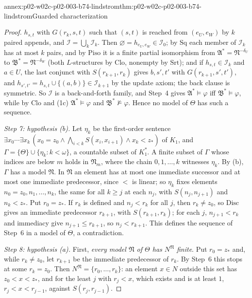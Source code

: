 \begin{annexitem}{annex:p02-w02c-p02-003-b74-lindstrom}{thm:p02-w02c-p02-003-b74-lindstrom}{Guarded characterization}
\begin{proof}
\(h_{s,t}\) with \(G(r_k,s,t)\) such that \((s,t)\) is reached from
\((e_U,e_W)\) by \(k\) paired appends, and \(\mathcal I=\bigcup_k\mathcal
I_k\).  Then \(\varnothing=h_{e_U,e_W}\in\mathcal I_0\); by \(\mathrm{Sq}\)
each member of \(\mathcal I_k\) has at most \(k\) pairs, and by
\(\mathrm{Piso}\) it is a finite partial isomorphism from \(\mathfrak
A^{\ast}=\mathfrak N^{-\delta_U}\) to \(\mathfrak B^{\ast}=\mathfrak
N^{-\delta_W}\) (both \(L\)-structures by \(\mathrm{Clo}\), nonempty by
\(\mathrm{Srt}\)); and if \(h_{s,t}\in\mathcal I_k\) and \(a\in U\), the
last conjunct with \(S(r_{k+1},r_k)\) gives \(b,s',t'\) with
\(G(r_{k+1},s',t')\), and \(h_{s',t'}=h_{s,t}\cup\{(a,b)\}\in\mathcal
I_{k+1}\) by the update axiom; the back clause is symmetric.  So
\(\mathcal I\) is a back-and-forth family, and Step~4 gives
\(\mathfrak A^{\ast}\models\varphi\) iff \(\mathfrak B^{\ast}\models\varphi\),
while by \(\mathrm{Clo}\) and (1c) \(\mathfrak A^{\ast}\models\varphi\) and
\(\mathfrak B^{\ast}\not\models\varphi\).  Hence no model of \(\Theta\) has
such a sequence.

\emph{Step 7: hypothesis (b).}  Let \(\eta_k\) be the first-order sentence
\(\exists x_0\cdots\exists x_k\,(x_0=z_0\land\bigwedge_{i<k}S(x_i,x_{i+1})
\land x_k<z_\ast)\) of \(K_1\), and \(\Gamma=\{\Theta\}\cup\{\eta_k:k<\omega\}\),
a countable subset of \(K_1^{\ast}\).  A finite subset of \(\Gamma\) whose
indices are below \(m\) holds in \(\mathfrak N_m\), where the chain
\(0,1,\ldots,k\) witnesses \(\eta_k\).  By (b), \(\Gamma\) has a model
\(\mathfrak N\).  In \(\mathfrak N\) an element has at most one immediate
successor and at most one immediate predecessor, since \(<\) is linear; so
\(\eta_k\) fixes elements \(n_0=z_0,n_1,\ldots,n_k\), the same for all
\(k\geq j\) at each \(n_j\), with \(S(n_j,n_{j+1})\) and \(n_k<z_\ast\).  Put
\(r_0=z_\ast\).  If \(r_k\) is defined and \(n_j<r_k\) for all \(j\), then
\(r_k\neq z_0\), so \(\mathrm{Disc}\) gives an immediate predecessor
\(r_{k+1}\), with \(S(r_{k+1},r_k)\); for each \(j\), \(n_{j+1}<r_k\) and
immediacy give \(n_{j+1}\leq r_{k+1}\), so \(n_j<r_{k+1}\).  This defines
the sequence of Step~6 in a model of \(\Theta\), a contradiction.

\emph{Step 8: hypothesis (a).}  First, \emph{every model \(\mathfrak N\) of
\(\Theta\) has \(N^{\mathfrak N}\) finite}.  Put \(r_0=z_\ast\) and, while
\(r_k\neq z_0\), let \(r_{k+1}\) be the immediate predecessor of \(r_k\).
By Step~6 this stops at some \(r_k=z_0\).  Then \(N^{\mathfrak
N}=\{r_0,\ldots,r_k\}\): an element \(x\in N\) outside this set has
\(z_0<x<z_\ast\), and for the least \(j\) with \(r_j<x\), which exists and
is at least \(1\), \(r_j<x<r_{j-1}\), against \(S(r_j,r_{j-1})\).


\end{proof}
\end{annexitem}

